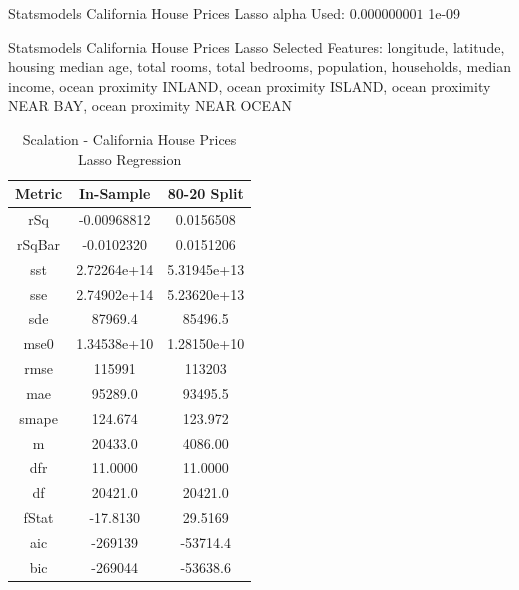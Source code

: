 \documentclass{article}
\begin{document}
\noindent Statsmodels California House Prices Lasso alpha Used: $0.000000001$ 1e-09

\noindent Statsmodels California House Prices Lasso Selected Features: longitude, latitude, housing median age, total rooms, total bedrooms, population, households, median income, ocean proximity INLAND, ocean proximity ISLAND, ocean proximity NEAR BAY, ocean proximity NEAR OCEAN

\begin{table}[H]
\centering
\caption{Scalation - California House Prices Lasso Regression}
\label{tab:Scalation - House Prices Lasso Regression}
\begin{tabular}{|c|c|c|} \hline 
Metric & In-Sample & 80-20 Split \\ \hline \hline 
rSq &-0.00968812 &      0.0156508 \\ \hline 
rSqBar &-0.0102320 &    0.0151206 \\ \hline 
sst &2.72264e+14 &      5.31945e+13 \\ \hline 
sse &2.74902e+14 &      5.23620e+13 \\ \hline 
sde &87969.4 &  85496.5 \\ \hline 
mse0 &1.34538e+10 &     1.28150e+10 \\ \hline 
rmse &115991 &  113203 \\ \hline 
mae &95289.0 &  93495.5 \\ \hline 
smape &124.674 &        123.972 \\ \hline 
m &20433.0 &    4086.00 \\ \hline 
dfr &11.0000 &  11.0000 \\ \hline 
df &20421.0 &   20421.0 \\ \hline 
fStat &-17.8130 &       29.5169 \\ \hline 
aic &-269139 &  -53714.4 \\ \hline 
bic &-269044 &  -53638.6 \\ \hline 
\end{tabular}
\end{table}
\end{document}

